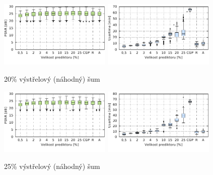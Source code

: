 \begin{figure}[H]
    \centering
    \includegraphics[width=0.475\textwidth]{fig/plot/compare/impulse20-100kg-psnrtest.pdf}
    \hskip0.5cm
    \includegraphics[width=0.475\textwidth]{fig/plot/compare/impulse20-100kg-usertime.pdf}
    \caption{20\% výstřelový (náhodný) šum}
\end{figure}

\begin{figure}[H]
    \centering
    \includegraphics[width=0.475\textwidth]{fig/plot/compare/impulse25-100kg-psnrtest.pdf}
    \hskip0.5cm
    \includegraphics[width=0.475\textwidth]{fig/plot/compare/impulse25-100kg-usertime.pdf}
    \caption{25\% výstřelový (náhodný) šum}
\end{figure}

